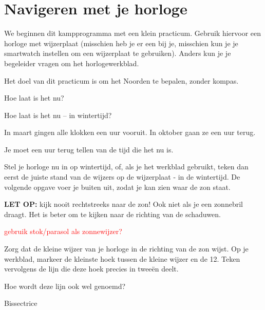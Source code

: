 \chapter{Navigeren met je horloge}

We beginnen dit kampprogramma met een klein practicum. Gebruik hiervoor een horloge met wijzerplaat (misschien heb je er een bij je, misschien kun je je smartwatch instellen om een wijzerplaat te gebruiken). Anders kun je je begeleider vragen om het horlogewerkblad.

Het doel van dit practicum is om het Noorden te bepalen, zonder kompas.

\begin{opgave}[\vinger]
    \begin{subopgave}
        Hoe laat is het nu?
    \end{subopgave}
    \begin{subopgave}
        Hoe laat is het nu -- in wintertijd?
        \begin{hint}
            In maart gingen alle klokken een uur vooruit. In oktober gaan ze een uur terug. 
        \end{hint}
        \begin{antwoord}
            Je moet een uur terug tellen van de tijd die het nu is.
        \end{antwoord}
    \end{subopgave}
\end{opgave}

Stel je horloge nu in op wintertijd, of, als je het werkblad gebruikt, teken dan eerst de juiste stand van de wijzers op de wijzerplaat - in de wintertijd. De volgende opgave voer je buiten uit, zodat je kan zien waar de zon staat.

\textbf{LET OP:} kijk nooit rechtstreeks naar de zon! Ook niet als je een zonnebril draagt. Het is beter om te kijken naar de richting van de schaduwen.

\textcolor{red}{gebruik stok/parasol als zonnewijzer?}

\begin{opgave}[\schaar]
    Zorg dat de kleine wijzer van je horloge in de richting van de zon wijst. Op je werkblad, markeer de kleinste hoek tussen de kleine wijzer en de 12. Teken vervolgens de lijn die deze hoek precies in twee\"{e}n deelt.
\end{opgave}

\begin{opgave}
    Hoe wordt deze lijn ook wel genoemd? 
    \begin{antwoord}
         Bissectrice
    \end{antwoord}
\end{opgave}

